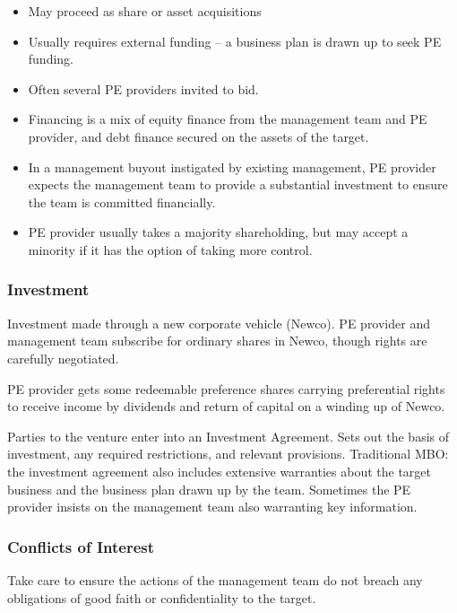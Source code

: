 \documentclass[
]{article}
\newenvironment{Shaded}{}{}
\newcommand{\NormalTok}[1]{#1}
\providecommand{\tightlist}{%
  \setlength{\itemsep}{0pt}\setlength{\parskip}{0pt}}
\begin{document}
\begin{itemize}
\tightlist
\item
  May proceed as share or asset acquisitions
\item
  Usually requires external funding -- a business plan is drawn up to
  seek PE funding.
\item
  Often several PE providers invited to bid.
\item
  Financing is a mix of equity finance from the management team and PE
  provider, and debt finance secured on the assets of the target.
\item
  In a management buyout instigated by existing management, PE provider
  expects the management team to provide a substantial investment to
  ensure the team is committed financially.
\item
  PE provider usually takes a majority shareholding, but may accept a
  minority if it has the option of taking more control.
\end{itemize}

\hypertarget{investment}{%
\subsubsection{Investment}\label{investment}}

Investment made through a new corporate vehicle (Newco). PE provider and
management team subscribe for ordinary shares in Newco, though rights
are carefully negotiated.

PE provider gets some redeemable preference shares carrying preferential
rights to receive income by dividends and return of capital on a winding
up of Newco.

Parties to the venture enter into an Investment Agreement. Sets out the
basis of investment, any required restrictions, and relevant provisions.
Traditional MBO: the investment agreement also includes extensive
warranties about the target business and the business plan drawn up by
the team. Sometimes the PE provider insists on the management team also
warranting key information.

\hypertarget{conflicts-of-interest}{%
\subsubsection{Conflicts of Interest}\label{conflicts-of-interest}}

\begin{Shaded}
\begin{Highlighting}[]
\NormalTok{Take care to ensure the actions of the management team do not breach any obligations of good faith or confidentiality to the target. }
\end{Highlighting}
\end{Shaded}
\end{document}
